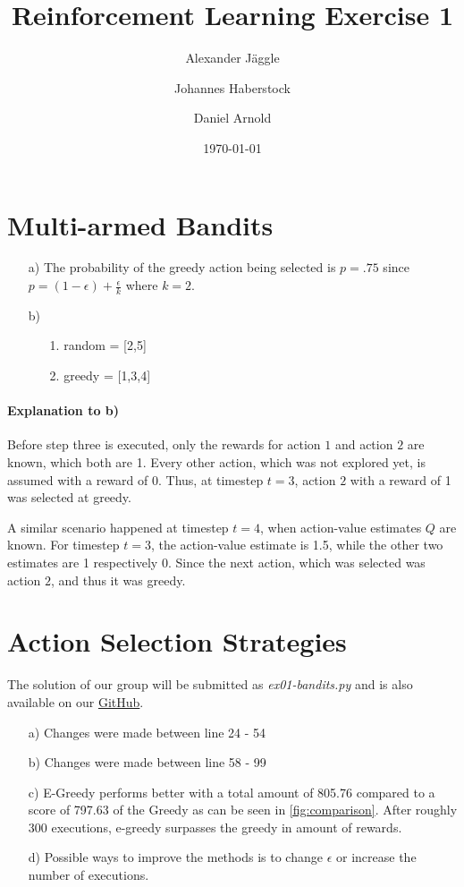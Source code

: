 \documentclass{article}
\title{Reinforcement Learning Exercise 1}
\author{Alexander J\"aggle}
\author{Johannes Haberstock}
\author{Daniel Arnold}
\affil{M.Sc. Autonomous Systems, University of Stuttgart}
\date{\today}
\begin{document}
\maketitle

\section{Multi-armed Bandits}

\begin{itemize}
    \item[a)] The probability of the greedy action being selected is $p = .75$ since $p = (1- \epsilon) + \frac{\epsilon}{k}$ where $k = 2$.   
    \item[b)] {
    \begin{itemize}
        \item[1.] random = [{2,5}]
        \item[2.] greedy = [{1,3,4}]
    \end{itemize}
    }
\end{itemize}


\paragraph{Explanation to b)}
Before step three is executed, only the rewards for action $1$ and action $2$ are known, which both are 1. 
Every other action, which was not explored yet, is assumed with a reward of 0. Thus, at timestep $t = 3$, 
action $2$ with a reward of 1 was selected at greedy. 

A similar scenario happened at timestep $t = 4$, when action-value estimates $Q$ are known. For timestep $t = 3$,
the action-value estimate is 1.5, while the other two estimates are 1 respectively 0. Since the next action, which
was selected was action $2$, and thus it was greedy. 

\section{Action Selection Strategies}
The solution of our group will be submitted as \textit{ex01-bandits.py} and is also available on our 
\href{https://github.com/DesmoAlex/ReinforcementLearning_UniStgt/tree/master/ex01-bandits}{GitHub}.

\begin{itemize}
    \item[a)] Changes were made between line 24 - 54 
    \item[b)] Changes were made between line 58 - 99
    \item[c)] E-Greedy performs better with a total amount of 805.76 compared to a score of 797.63
                of the Greedy as can be seen in \cref{fig:comparison}. After roughly 300 executions, e-greedy surpasses the greedy in amount of
                rewards.   
                \item[d)] Possible ways to improve the methods is to change $\epsilon$ or increase the number of executions.
\end{itemize}
            
\end{document}
